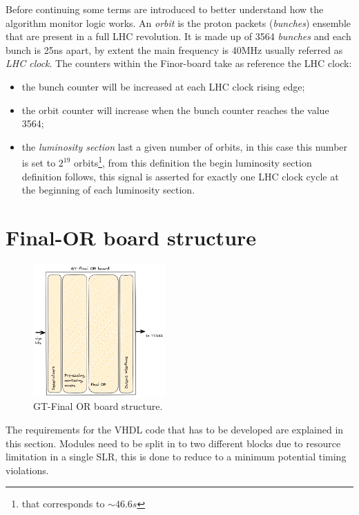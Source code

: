 \documentclass[../../main.tex]{subfiles}
\begin{document}
Before continuing some terms are introduced to better understand how the algorithm monitor logic works. An \textit{orbit} is the proton packets (\textit{bunches}) ensemble that are present in a full LHC revolution. It is made up of 3564 \textit{bunches} and each bunch is 25ns apart, by extent the main frequency is 40MHz usually referred as \textit{LHC clock}. The counters within the Finor-board take as reference the LHC clock: 
\begin{itemize}
    \item the bunch counter will be increased at each LHC clock rising edge;
    \item the orbit counter will increase when the bunch counter reaches the value 3564;
    \item the \textit{luminosity section} last a given number of orbits, in this case this number is set to $2^{19}$ orbits\footnote{that corresponds to $\sim 46.6s$}, from this definition the begin luminosity section definition follows, this signal is asserted for exactly one LHC clock cycle at the beginning of each luminosity section.
\end{itemize}

\section{Final-OR board structure}
\label{sec:Finor_struct}

\begin{figure}
    \centering
    \includegraphics[width=0.45\textwidth]{sections/06/Images/GT-finor.png}
    \caption{GT-Final OR board structure.}
    \label{fig:GT-finor}
\end{figure}

The requirements for the VHDL code that has to be developed are explained in this section. 
Modules need to be split in to two different blocks due to resource limitation in a single SLR, this is done to reduce to a minimum potential timing violations.  
\end{document}
